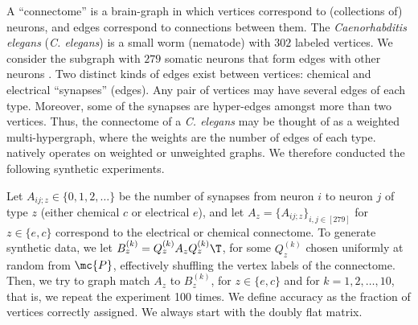 \documentclass[10pt,journal,cspaper,compsoc]{IEEEtran}
\begin{document}
A ``connectome'' is a brain-graph in which vertices correspond to (collections of) neurons, and edges correspond to connections between them. The \emph{Caenorhabditis elegans} (\emph{C. elegans}) is a small worm (nematode) with $302$ labeled vertices.  We consider the subgraph with $279$ somatic neurons that form edges with other neurons \cite{WhiteBrenner86, Varshney2011}.  Two distinct kinds of edges exist between vertices: chemical and electrical ``synapses'' (edges). Any pair of vertices may have several edges of each type. Moreover, some of the synapses are hyper-edges amongst more than two vertices.   Thus, the connectome of a \emph{C. elegans} may be thought of as a weighted multi-hypergraph, where the weights are the number of edges of each type.  \FAQ natively operates on weighted or unweighted graphs.  We therefore conducted the following synthetic experiments.  

Let $A_{ij;z} \in \{0,1,2,\ldots\}$ be the number of synapses from neuron $i$ to neuron $j$ of type $z$ (either chemical $c$ or electrical $e$), and let $A_z=\{A_{ij;z}\}_{i,j \in [279]}$ for $z \in \{e,c\}$ correspond to the electrical or chemical connectome.  To generate synthetic data, we let $B_z^{(k)}=Q_z^{(k)} A_z {Q_z^{(k)}}\T$, for some $Q_z^{(k)}$ chosen uniformly at random from $\mc{P}$, effectively shuffling the vertex labels of the connectome.  Then, we try to graph match $A_z$ to $B_z^{(k)}$, for $z \in \{e,c\}$ and for $k =1,2,\ldots, 10$, that is, we repeat the experiment 100 times.  We define accuracy as the fraction of vertices correctly assigned. We always start with the doubly flat matrix.

\end{document}
